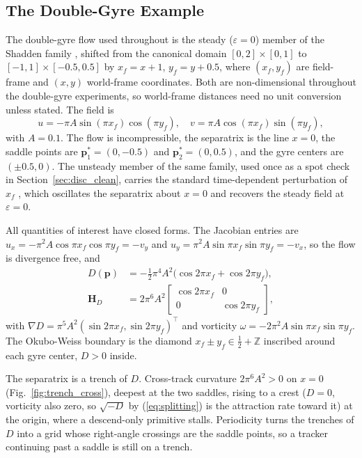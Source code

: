 \documentclass[lettersize,journal]{IEEEtran}
\begin{document}
\subsection{The Double-Gyre Example}
\label{sec:dg_example}

The double-gyre flow used throughout is the steady ($\varepsilon = 0$)
member of the Shadden family \cite{11}, shifted from the canonical domain
$[0,2] \times [0,1]$ to $[-1,1] \times [-0.5, 0.5]$ by
$x_f = x + 1$, $y_f = y + 0.5$, where $(x_f, y_f)$ are field-frame and
$(x, y)$ world-frame coordinates. Both are non-dimensional throughout the
double-gyre experiments, so world-frame distances need no unit
conversion unless stated. The field is
\begin{equation}
    u = -\pi A \sin(\pi x_f) \cos(\pi y_f), \quad
    v = \pi A \cos(\pi x_f) \sin(\pi y_f),
    \label{eq:dg_u}
\end{equation}
with $A = 0.1$. The flow is incompressible, the separatrix is the line
$x = 0$, the saddle points are $\mathbf{p}^*_1 = (0, -0.5)$ and
$\mathbf{p}^*_2 = (0, 0.5)$, and the gyre centers are $(\pm 0.5, 0)$.
The unsteady member of the same family, used once as a spot check in
Section~\ref{sec:disc_clean}, carries the standard time-dependent
perturbation of $x_f$ \cite{11}, which oscillates the separatrix about
$x = 0$ and recovers the steady field at $\varepsilon = 0$.

All quantities of interest have closed forms. The Jacobian entries are
$u_x = -\pi^2 A \cos\pi x_f \cos\pi y_f = -v_y$ and
$u_y = \pi^2 A \sin\pi x_f \sin\pi y_f = -v_x$, so the flow is divergence
free, and
\begin{equation}
    \begin{aligned}
    D(\mathbf{p}) &= -\tfrac{1}{2}\pi^4 A^2
        \bigl(\cos 2\pi x_f + \cos 2\pi y_f\bigr), \\
    \mathbf{H}_D &= 2\pi^6 A^2
        \begin{bmatrix} \cos 2\pi x_f & 0 \\ 0 & \cos 2\pi y_f \end{bmatrix},
    \end{aligned}
    \label{eq:det_analytic_main}
\end{equation}
with $\nabla D = \pi^5 A^2 (\sin 2\pi x_f, \sin 2\pi y_f)^\top$ and
vorticity $\omega = -2\pi^2 A \sin\pi x_f \sin\pi y_f$. The
Okubo-Weiss boundary is the diamond $x_f \pm y_f \in \tfrac{1}{2} +
\mathbb{Z}$ inscribed around each gyre center, $D > 0$ inside.

The separatrix is a trench of $D$. Cross-track curvature
$2\pi^6 A^2 > 0$ on $x = 0$ (Fig.~\ref{fig:trench_cross}), deepest at
the two saddles, rising to a crest ($D = 0$, vorticity also zero, so
$\sqrt{-D}$ by (\ref{eq:splitting}) is the attraction rate toward it)
at the origin, where a descend-only primitive stalls. Periodicity
turns the trenches of $D$ into a grid whose right-angle crossings
are the saddle points, so a tracker continuing past a saddle is still
on a trench.
\end{document}
